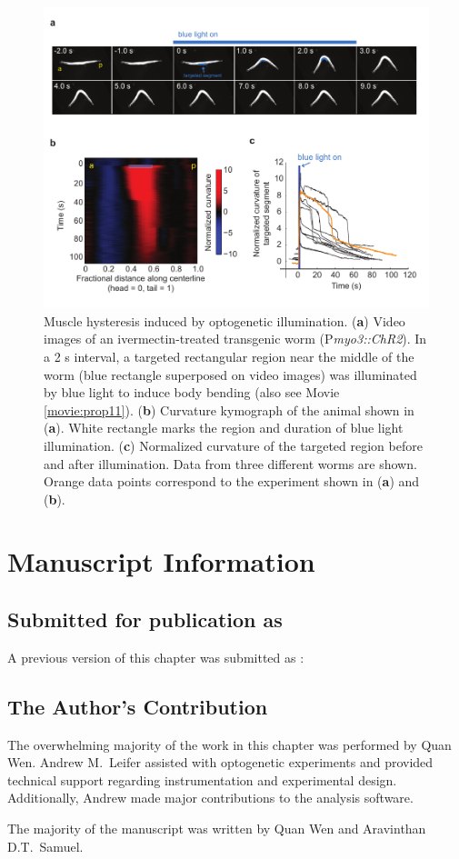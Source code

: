 \begin{figure} 
\includegraphics[width=\textwidth]{figures/prop_sup4}
\caption[Muscle hysteresis induced by optogenetic illumination. ] { Muscle hysteresis induced by optogenetic illumination. 
(\textbf{a}) Video images of an ivermectin-treated transgenic worm (P\textit{myo3::ChR2}). In a 2 s interval, 
a targeted rectangular region near the middle of the worm (blue rectangle superposed on video 
images) was illuminated by blue light to induce body bending (also see Movie  \ref{movie:prop11}). 
(\textbf{b}) Curvature kymograph of the animal shown in (\textbf{a}). White rectangle marks the region and 
duration of blue light illumination. 
(\textbf{c}) Normalized curvature of the targeted region before and after illumination. Data from three 
different worms are shown. Orange data points correspond to the experiment shown in (\textbf{a}) and (\textbf{b}).
\label{fig:prop_sup4}}
\end{figure}




\section{Manuscript Information}
\subsection{Submitted for publication as}
A previous version of this chapter was submitted as \citep{wen_bending_2011}:


\subsection{The Author's Contribution}
The overwhelming majority of the work in this chapter was performed by Quan Wen. Andrew M.~Leifer assisted with optogenetic experiments and provided technical support regarding instrumentation and experimental design. Additionally, Andrew made major contributions to the analysis software. 

The majority of the manuscript was written by Quan Wen and Aravinthan D.T.~Samuel.

